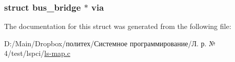 \subsubsection[{\texorpdfstring{via}{via}}]{\setlength{\rightskip}{0pt plus 5cm}struct {\bf bus\+\_\+bridge} $\ast$ via}\hypertarget{structbus__info_a59d40f986c045013a79ee249a987219b}{}\label{structbus__info_a59d40f986c045013a79ee249a987219b}


The documentation for this struct was generated from the following file\+:\begin{DoxyCompactItemize}
\item 
D\+:/\+Main/\+Dropbox/политех/Системное программирование/Л. р. № 4/test/lspci/\hyperlink{ls-map_8c}{ls-\/map.\+c}\end{DoxyCompactItemize}
